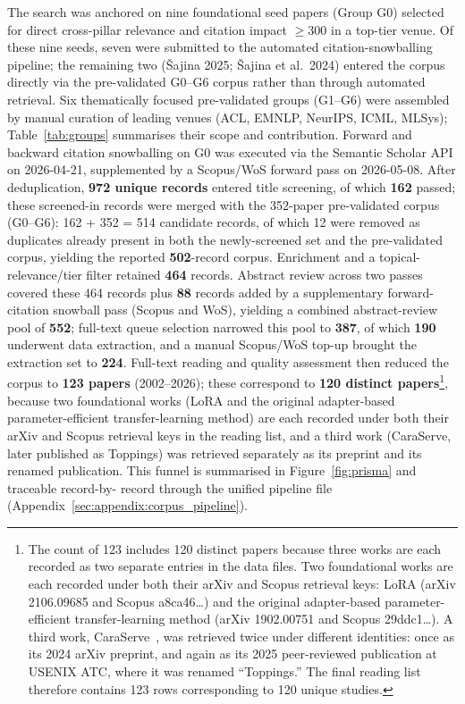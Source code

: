 The search was anchored on nine foundational seed papers (Group G0) selected
for direct cross-pillar relevance and citation impact $\geq$300 in a top-tier
venue. Of these nine seeds, seven were submitted to the automated
citation-snowballing pipeline; the remaining two ({\v{S}}ajina 2025;
{\v{S}}ajina et al.\ 2024) entered the corpus directly via the pre-validated
G0--G6 corpus rather than through automated retrieval. Six thematically focused
pre-validated groups (G1--G6) were assembled
by manual curation of leading venues (ACL, EMNLP, NeurIPS, ICML, MLSys);
Table~\ref{tab:groups} summarises their scope and contribution. Forward and
backward citation snowballing on G0 was executed via the Semantic Scholar API
on 2026-04-21, supplemented by a Scopus/WoS forward pass on 2026-05-08.
After deduplication, \textbf{972 unique records} entered title screening, of
which \textbf{162} passed; these screened-in records were merged with the
352-paper pre-validated corpus (G0--G6): 162 + 352 = 514 candidate records, of
which 12 were removed as duplicates already present in both the newly-screened
set and the pre-validated corpus, yielding the reported \textbf{502}-record
corpus. Enrichment and a topical-relevance/tier filter
retained \textbf{464} records. Abstract review across two passes covered these
464 records plus \textbf{88} records added by a supplementary forward-citation
snowball pass (Scopus and WoS), yielding a combined abstract-review pool of
\textbf{552}; full-text queue selection narrowed this pool to \textbf{387}, of
which
\textbf{190} underwent data extraction, and a manual Scopus/WoS top-up brought
the extraction set to \textbf{224}. Full-text reading and quality assessment
then reduced the corpus to \textbf{123 papers} (2002--2026); these correspond
to \textbf{120 distinct papers}\footnote{The count of 123 includes 120 distinct
papers because three works are each recorded as two separate entries in the
data files. Two foundational works are each recorded under both their arXiv
and Scopus retrieval keys: LoRA (arXiv 2106.09685 and Scopus a8ca46\ldots) and
the original adapter-based parameter-efficient transfer-learning method (arXiv
1902.00751 and Scopus 29ddc1\ldots). A third work, CaraServe~\cite{Li2024CaraServe},
was retrieved twice under different identities: once as its 2024 arXiv
preprint, and again as its 2025 peer-reviewed publication at USENIX ATC, where
it was renamed ``Toppings.'' The final reading list therefore contains
123 rows corresponding to 120 unique studies.}, because two foundational works
(LoRA and the original adapter-based parameter-efficient transfer-learning
method) are each recorded under both their arXiv and Scopus retrieval keys in
the reading list, and a third work (CaraServe, later published as Toppings)
was retrieved separately as its preprint and its renamed publication.
This funnel is summarised in Figure~\ref{fig:prisma} and traceable record-by-
record through the unified pipeline file (Appendix~\ref{sec:appendix:corpus_pipeline}).

